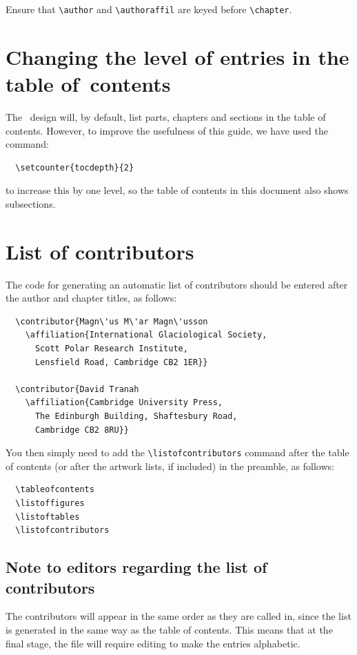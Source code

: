 Ensure that \verb"\author" and \verb"\authoraffil" are keyed before \verb"\chapter".


\section{Changing the level of entries in the table of~contents}
\label{changingentries}
The \cambridge\ design will, by default, list parts, chapters and sections in the table of contents. However, to improve the usefulness of this guide, we have used the command:
\begin{verbatim}
  \setcounter{tocdepth}{2}
\end{verbatim}
to increase this by one level, so the table of contents in this document also shows subsections.

\section{List of contributors}
\label{contrib}
The code for generating an automatic list of contributors should be entered after the author and chapter titles, as follows:
\begin{verbatim}
  \contributor{Magn\'us M\'ar Magn\'usson
    \affiliation{International Glaciological Society,
      Scott Polar Research Institute,
      Lensfield Road, Cambridge CB2 1ER}}

  \contributor{David Tranah
    \affiliation{Cambridge University Press,
      The Edinburgh Building, Shaftesbury Road,
      Cambridge CB2 8RU}}
\end{verbatim}
You then simply need to add the \verb"\listofcontributors" command after the table of contents (or after the artwork lists, if included) in the preamble, as follows:
\begin{verbatim}
  \tableofcontents
  \listoffigures
  \listoftables
  \listofcontributors
\end{verbatim}

\subsection{Note to editors regarding the list of contributors}

The contributors will appear in the same order as they are called in, since the list is generated in the same way as the table of contents. This means that at the final stage, the file will require editing to make the entries alphabetic.

